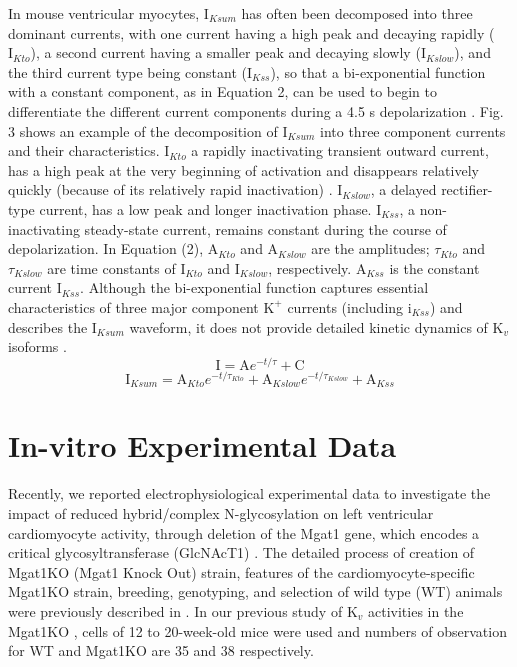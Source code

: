 \documentclass[journal]{IEEEtran}
\begin{document}
In mouse ventricular myocytes, $\text{I}_{Ksum}$ has often been decomposed into three dominant currents, with one current having a high peak and decaying rapidly ($\text{I}_{Kto}$), a second current having a smaller peak and decaying slowly ($\text{I}_{Kslow}$), and the third current type being constant ($\text{I}_{Kss}$), so that a bi-exponential function with a constant component, as in Equation 2, can be used to begin to differentiate the different current components during a 4.5 s depolarization \cite{ednie2015reduced, roepke2008targeted, cheng2011cortactin}. Fig. 3 shows an example of the decomposition of $\text{I}_{Ksum}$ into three component currents and their characteristics. $\text{I}_{Kto}$ a rapidly inactivating transient outward current, has a high peak at the very beginning of activation and disappears relatively quickly (because of its relatively rapid inactivation) \cite{guo2005targeted}. $\text{I}_{Kslow}$, a delayed rectifier-type current, has a low peak and longer inactivation phase. $\text{I}_{Kss}$, a non-inactivating steady-state current, remains constant during the course of depolarization. In Equation (2), $\text{A}_{Kto}$ and $\text{A}_{Kslow}$ are the amplitudes; $\tau_{Kto}$ and $\tau_{Kslow}$ are time constants of $\text{I}_{Kto}$ and $\text{I}_{Kslow}$, respectively. $\text{A}_{Kss}$ is the constant current $\text{I}_{Kss}$. Although the bi-exponential function captures essential characteristics of three major component $\text{K}^{+}$ currents (including $\text{i}_{Kss}$) and describes the $\text{I}_{Ksum}$ waveform, it does not provide detailed kinetic dynamics of $\text{K}_{v}$ isoforms \cite{plumlee2016calibrating}. 
\begin{equation}
    \text{I} = \text{A}e^{-t/\tau} + \text{C}
\end{equation}
\begin{equation}
    \text{I}_{Ksum} = \text{A}_{Kto} e^{-t/\tau_{Kto}} + \text{A}_{Kslow} e^{-t/\tau_{Kslow}} + \text{A}_{Kss}
\end{equation}

\section{In-vitro Experimental Data}
Recently, we reported electrophysiological experimental data to investigate the impact of reduced hybrid/complex N-glycosylation on left ventricular cardiomyocyte activity, through deletion of the Mgat1 gene, which encodes a critical glycosyltransferase (GlcNAcT1) \cite{ednie2019reduced, ednie2019reduced2}. The detailed process of creation of Mgat1KO (Mgat1 Knock Out) strain, features of the cardiomyocyte-specific Mgat1KO strain, breeding, genotyping, and selection of wild type (WT) animals were previously described in \cite{ednie2019reduced2}. In our previous study of $\text{K}_{v}$ activities in the Mgat1KO \cite{ednie2019reduced}, cells of 12 to 20-week-old mice were used and numbers of observation for WT and Mgat1KO are 35 and 38 respectively.
\end{document}
